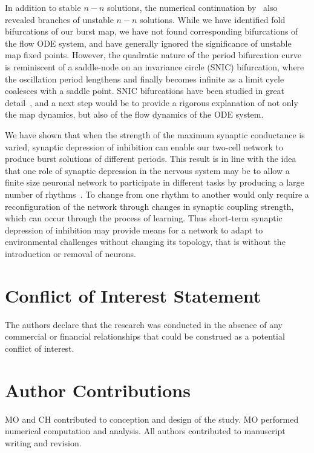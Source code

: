 \documentclass[utf8,draft]{frontiersFPHY} %
\begin{document}
In addition to stable $n-n$ solutions, the numerical continuation by~\citet{bose2011} also revealed branches of unstable $n-n$ solutions.
While we have identified fold bifurcations of our burst map, we have not found corresponding bifurcations of the flow ODE system, and have generally ignored the significance of unstable map fixed points.
However, the quadratic nature of the period bifurcation curve is reminiscent of a saddle-node on an invariance circle (SNIC) bifurcation, where the oscillation period lengthens and finally becomes infinite as a limit cycle coalesces with a saddle point.
SNIC bifurcations have been studied in great detail~\cite[e.g.][]{ermentrout1986}, and a next step would be to provide a rigorous explanation of not only the map dynamics, but also of the flow dynamics of the ODE system.

We have shown that when the strength of the maximum synaptic conductance is varied, synaptic depression of inhibition can enable our two-cell network to produce burst solutions of different periods.
This result is in line with the idea that one role of synaptic depression in the nervous system may be to allow a finite size neuronal network to participate in different tasks by producing a large number of rhythms~\citep{bose2011, jalil2004, li2007}.
To change from one rhythm to another would only require a reconfiguration of the network through changes in synaptic coupling strength, which can occur through the process of learning.
Thus short-term synaptic depression of inhibition may provide means for a network to adapt to environmental challenges without changing its topology, that is without the introduction or removal of neurons.


\section*{Conflict of Interest Statement}
The authors declare that the research was conducted in the absence of any commercial or financial relationships that could be construed as a potential conflict of interest.

\section*{Author Contributions}
MO and CH contributed to conception and design of the study.
MO performed numerical computation and analysis.
All authors contributed to manuscript writing and revision.
\end{document}

